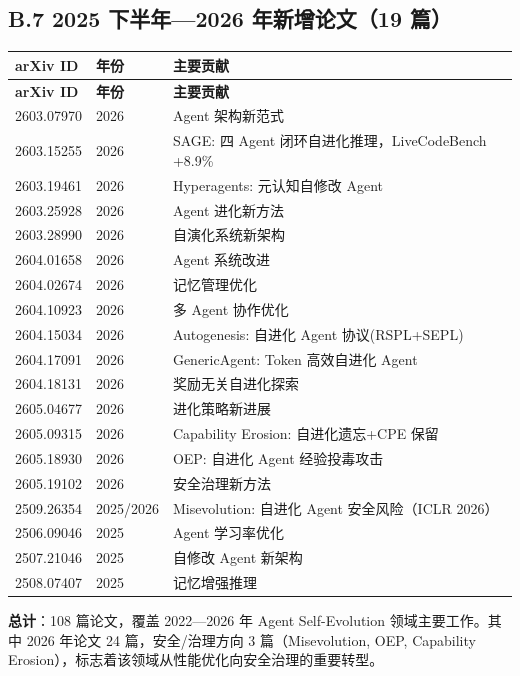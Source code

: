 \subsection*{B.7 2025 下半年—2026 年新增论文（19 篇）}

\begin{longtable}{llp{7cm}}
\toprule
\textbf{arXiv ID} & \textbf{年份} & \textbf{主要贡献} \\
\midrule
\endfirsthead
\toprule
\textbf{arXiv ID} & \textbf{年份} & \textbf{主要贡献} \\
\midrule
\endhead
\bottomrule
\endlastfoot

2603.07970 & 2026 & Agent 架构新范式 \\
2603.15255 & 2026 & SAGE: 四 Agent 闭环自进化推理，LiveCodeBench +8.9\% \\
2603.19461 & 2026 & Hyperagents: 元认知自修改 Agent \\
2603.25928 & 2026 & Agent 进化新方法 \\
2603.28990 & 2026 & 自演化系统新架构 \\
2604.01658 & 2026 & Agent 系统改进 \\
2604.02674 & 2026 & 记忆管理优化 \\
2604.10923 & 2026 & 多 Agent 协作优化 \\
2604.15034 & 2026 & Autogenesis: 自进化 Agent 协议(RSPL+SEPL) \\
2604.17091 & 2026 & GenericAgent: Token 高效自进化 Agent \\
2604.18131 & 2026 & 奖励无关自进化探索 \\
2605.04677 & 2026 & 进化策略新进展 \\
2605.09315 & 2026 & Capability Erosion: 自进化遗忘+CPE 保留 \\
2605.18930 & 2026 & OEP: 自进化 Agent 经验投毒攻击 \\
2605.19102 & 2026 & 安全治理新方法 \\
2509.26354 & 2025/2026 & Misevolution: 自进化 Agent 安全风险（ICLR 2026） \\
2506.09046 & 2025 & Agent 学习率优化 \\
2507.21046 & 2025 & 自修改 Agent 新架构 \\
2508.07407 & 2025 & 记忆增强推理 \\
\end{longtable}

\textbf{总计}：108 篇论文，覆盖 2022—2026 年 Agent Self-Evolution 领域主要工作。其中 2026 年论文 24 篇，安全/治理方向 3 篇（Misevolution, OEP, Capability Erosion），标志着该领域从性能优化向安全治理的重要转型。


